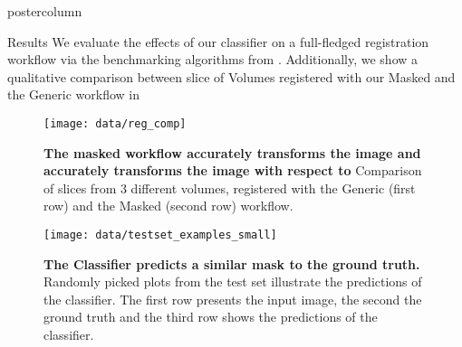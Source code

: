 \begin{frame}
\begin{columns}
\begin{column}{.59\textwidth}
\begin{beamercolorbox}[center]{postercolumn}
\begin{minipage}{.98\textwidth}
{                            \begin{myblock}{Results}
                                We evaluate the effects of our classifier on a full-fledged registration workflow via the benchmarking algorithms from \cite{irsabi}.
                                Additionally, we show a qualitative comparison between slice of Volumes registered with our Masked and the Generic workflow in
                                \begin{figure}
                                    \texttt{[image: data/reg\_comp]}
                                    \caption{\textbf{The masked workflow accurately transforms the image and accurately transforms the image with respect to } Comparison of slices from 3 different volumes, registered with the Generic (first row) and the Masked (second row) workflow.}
                                \end{figure}

                                \begin{figure}
                                    \texttt{[image: data/testset\_examples\_small]}
                                    \caption{\textbf{The Classifier predicts a similar mask to the ground truth.}
                                    Randomly picked plots from the test set illustrate the predictions of the classifier.
                                    The first row presents the input image, the second the ground truth and the third row shows the predictions of the classifier.}
                                \end{figure}



\end{myblock}}
\end{minipage}
\end{beamercolorbox}
\end{column}
\end{columns}
\end{frame}
